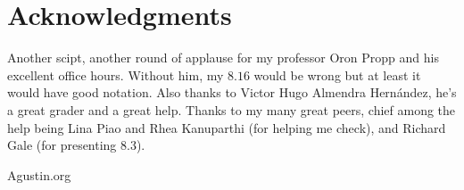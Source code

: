 \documentclass[openany, amssymb, psamsfonts]{amsart}
\theoremstyle{definition}
\numberwithin{equation}{section}
\begin{document}
\section*{Acknowledgments} 
Another scipt, another round of applause for my professor Oron Propp and his excellent office hours. Without him, my $8.16$ would be wrong but at least it would have good notation. Also thanks to Victor Hugo Almendra Hernández, he's a great grader and a great help. Thanks to my many great peers, chief among the help being Lina Piao and Rhea Kanuparthi (for helping me check), and Richard Gale (for presenting 8.3). 
\begin{thebibliography}{9}

 Agustin.org


\end{thebibliography}
\end{document}

